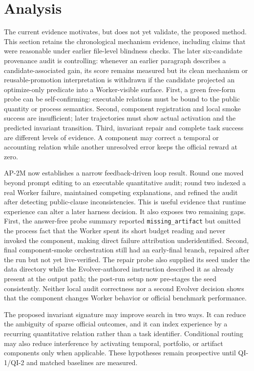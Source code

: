\section{Analysis}

The current evidence motivates, but does not yet validate, the proposed method.
This section retains the chronological mechanism evidence, including claims
that were reasonable under earlier file-level blindness checks. The later
six-candidate provenance audit is controlling: whenever an earlier paragraph
describes a candidate-associated gain, its score remains measured but its clean
mechanism or reusable-promotion interpretation is withdrawn if the candidate
projected an optimize-only predicate into a Worker-visible surface.
First, a green free-form probe can be self-confirming: executable relations must
be bound to the public quantity or process semantics. Second, component
registration and local smoke success are insufficient; later trajectories must
show actual activation and the predicted invariant transition. Third, invariant
repair and complete task success are different levels of evidence. A component
may correct a temporal or accounting relation while another unresolved error
keeps the official reward at zero.

AP-2M now establishes a narrow feedback-driven loop result. Round one moved
beyond prompt editing to an executable quantitative audit; round two indexed a
real Worker failure, maintained competing explanations, and refined the audit
after detecting public-clause inconsistencies. This is useful evidence that
runtime experience can alter a later harness decision. It also exposes two
remaining gaps. First, the answer-free probe summary reported
\texttt{missing\_artifact} but omitted the process fact that the Worker spent
its short budget reading and never invoked the component, making direct failure
attribution underidentified. Second, final component-smoke orchestration still
had an early-final branch, repaired after the run but not yet live-verified.
The repair probe also supplied its seed under the data directory while the
Evolver-authored instruction described it as already present at the output
path; the post-run setup now pre-stages the seed consistently.
Neither local audit correctness nor a second Evolver decision shows that the
component changes Worker behavior or official benchmark performance.

The proposed invariant signature may improve search in two ways. It can reduce
the ambiguity of sparse official outcomes, and it can index experience by a
recurring quantitative relation rather than a task identifier. Conditional
routing may also reduce interference by activating temporal, portfolio, or
artifact components only when applicable. These hypotheses remain prospective
until QI-1/QI-2 and matched baselines are measured.

